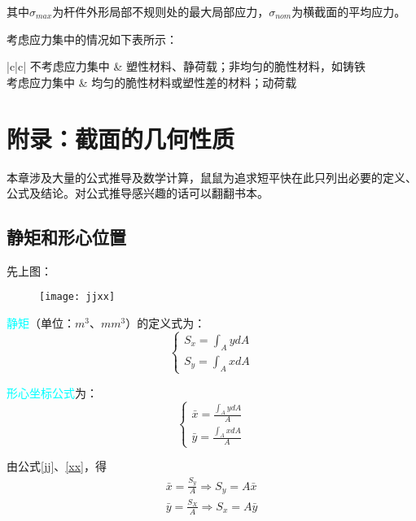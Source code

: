 \documentclass[10pt,a4paper]{ctexart}
\begin{document}
其中$\sigma_{max}$为杆件外形局部不规则处的最大局部应力，$\sigma_{nom}$为横截面的平均应力。

考虑应力集中的情况如下表所示：
\begin{table}[h]
	\centering
	\begin{tblr}{|c|c|}%
		\hline
		不考虑应力集中 & 塑性材料、静荷载；非均匀的脆性材料，如铸铁\\
		\hline
		考虑应力集中 & 均匀的脆性材料或塑性差的材料；动荷载\\
		\hline	
	\end{tblr}
\end{table}
\newpage

\section{附录\uppercase\expandafter{}：截面的几何性质}
本章涉及大量的公式推导及数学计算，鼠鼠为追求短平快在此只列出必要的定义、公式及结论。对公式推导感兴趣的话可以翻翻书本。

\subsection{静矩和形心位置}
先上图：
\begin{figure}[htp]%
	\centering
	\texttt{[image: jjxx]}
\end{figure}

\textcolor{cyan}{静矩}（单位：$m^3$、$mm^3$）的定义式为：
\begin{equation}
	\begin{cases}
		S_x=\int_A ydA\\
		S_y=\int_A xdA
	\end{cases}
\label{jj}
\end{equation}

\textcolor{cyan}{形心坐标公式}为：
\begin{equation}
	\begin{cases}
		\bar{x}=\frac{\int_A ydA}{A}\\
		\bar{y}=\frac{\int_A xdA}{A}
	\end{cases}
	\label{xx}
\end{equation}

由公式\ref{jj}、\ref{xx}，得
	\begin{gather}%
	\bar{x}=\frac{S_y}{A} \Rightarrow S_y=A\bar{x}\\	
	\bar{y}=\frac{S_X}{A} \Rightarrow S_x=A\bar{y}
	\end{gather}
\end{document}
